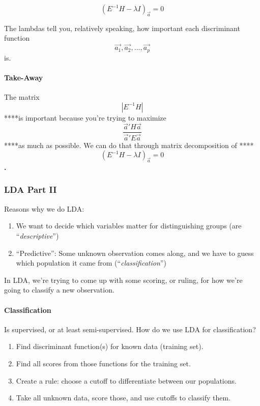 \[(E^{-1}H - \lambda I)_{\vec{a}} = 0\]

The lambdas tell you, relatively speaking, how important each
discriminant function \[\vec{a_1}, \vec{a_2}, ..., \vec{a_p}\] is.

\hypertarget{take-away}{%
\paragraph{Take-Away}\label{take-away}}

The matrix \[| E^{-1}H |\] ****is important because you're trying to
maximize \[\frac{\vec{a}'H\vec{a}}{\vec{a}'E\vec{a}}\] ****as much as
possible. We can do that through matrix decomposition of
****\[(E^{-1}H - \lambda I)_{\vec{a}} = 0\]\textbf{.}

\hypertarget{lda-part-ii}{%
\subsubsection{\texorpdfstring{\textbf{LDA Part
II}}{LDA Part II}}\label{lda-part-ii}}

Reasons why we do LDA:

\begin{enumerate}
\def\labelenumi{\arabic{enumi}.}
\tightlist
\item
  We want to decide which variables matter for distinguishing groups
  (are ``\emph{descriptive}'')
\item
  ``Predictive'': Some unknown observation comes along, and we have to
  guess which population it came from (``\emph{classification}'')
\end{enumerate}

In LDA, we're trying to come up with some scoring, or ruling, for how
we're going to classify a new observation.

\hypertarget{classification}{%
\paragraph{Classification}\label{classification}}

Is supervised, or at least semi-supervised. How do we use LDA for
classification?

\begin{enumerate}
\def\labelenumi{\arabic{enumi}.}
\tightlist
\item
  Find discriminant function(s) for known data (training set).
\item
  Find all scores from those functions for the training set.
\item
  Create a rule: choose a cutoff to differentiate between our
  populations.
\item
  Take all unknown data, score those, and use cutoffs to classify them.
\end{enumerate}

